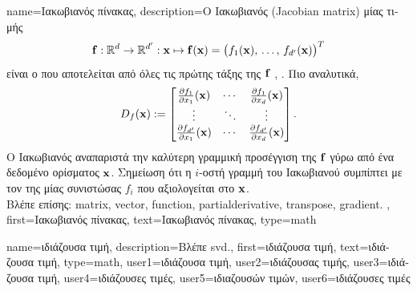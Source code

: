 {name={\foreignlanguage{greek}{Ιακωβιανός πίνακας}},
	description={\foreignlanguage{greek}{Ο Ιακωβιανός}  (Jacobian matrix) 
		\foreignlanguage{greek}{μίας}   \foreignlanguage{greek}{τιμής
		$${\bf f}:\mathbb{R}^{d}\rightarrow\mathbb{R}^{d'}: 
		{\bf x} \mapsto {\bf f}({\bf x}) = \big(f_{1}({\bf x}),\,\ldots,\,f_{d'}({\bf x}) \big)^{T}$$
		είναι ο}  \foreignlanguage{greek}{που αποτελείται από όλες τις πρώτης τάξης}  
		\foreignlanguage{greek}{της} ${\bf f}$ \cite{RudinBookPrinciplesMatheAnalysis}, \cite{HolderEichholz}. \foreignlanguage{greek}{Πιο αναλυτικά}, 
		\[
			D_{f}({\bf x})
			:=
			\begin{bmatrix}
				\frac{\partial f_{1}}{\partial x_{1}}({\bf x}) & \cdots &
				\frac{\partial f_{1}}{\partial x_{d}}({\bf x}) \\
				\vdots & \ddots & \vdots \\
				\frac{\partial f_{d'}}{\partial x_{1}}({\bf x}) & \cdots &
				\frac{\partial f_{d'}}{\partial x_{d}}({\bf x})
			\end{bmatrix}.
		\]
		\foreignlanguage{greek}{Ο Ιακωβιανός}  \foreignlanguage{greek}{αναπαριστά την καλύτερη γραμμική προσέγγιση της 
		${\bf f}$ γύρω από ένα δεδομένο}  \foreignlanguage{greek}{ορίσματος ${\bf x}$. Σημείωση ότι η $i$-οστή γραμμή του 
		Ιακωβιανού}  \foreignlanguage{greek}{συμπίπτει με τον}  \foreignlanguage{greek}{της} 
		 \foreignlanguage{greek}{μίας}  \foreignlanguage{greek}{συνιστώσας $f_i$ που αξιολογείται 
		στο} ${\bf x}$.
		\\
		\foreignlanguage{greek}{Βλέπε επίσης:} \gls{matrix}, \gls{vector}, \gls{function}, \gls{partialderivative}, \gls{transpose}, \gls{gradient}. },
	first={\foreignlanguage{greek}{Ιακωβιανός πίνακας}},
	text={\foreignlanguage{greek}{Ιακωβιανός πίνακας}},
	type=math
}

{name={\foreignlanguage{greek}{ιδιάζουσα τιμή}}, 
 	description={\foreignlanguage{greek}{Βλέπε} \gls{svd}.},
 	first={\foreignlanguage{greek}{ιδιάζουσα τιμή}},
	text={\foreignlanguage{greek}{ιδιάζουσα τιμή}},
	type=math,
	user1={\foreignlanguage{greek}{ιδιάζουσα τιμή}}, %
  	user2={\foreignlanguage{greek}{ιδιάζουσας τιμής}}, %
	user3={\foreignlanguage{greek}{ιδιάζουσα τιμή}}, %
	user4={\foreignlanguage{greek}{ιδιάζουσες τιμές}}, %
  	user5={\foreignlanguage{greek}{ιδιαζουσών τιμών}}, %
	user6={\foreignlanguage{greek}{ιδιάζουσες τιμές}} %
}

